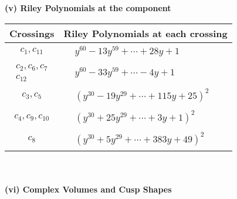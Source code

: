 \documentclass[1p]{elsarticle_modified}
\theoremstyle{definition}
\begin{document}
\newpage\renewcommand{\arraystretch}{1}
\flushleft \textbf{(v) Riley Polynomials at the component}\newline \\
\begin{tabular}{m{50pt}|m{274pt}}
Crossings & \hspace{64pt}Riley Polynomials at each crossing \\
\hline $$\begin{aligned}c_{1},c_{11}\end{aligned}$$&$\begin{aligned}
&y^{60}-13 y^{59}+\cdots+28 y+1
\end{aligned}$\\
\hline $$\begin{aligned}c_{2},c_{6},c_{7}\\c_{12}\end{aligned}$$&$\begin{aligned}
&y^{60}-33 y^{59}+\cdots-4 y+1
\end{aligned}$\\
\hline $$\begin{aligned}c_{3},c_{5}\end{aligned}$$&$\begin{aligned}
&(y^{30}-19 y^{29}+\cdots+115 y+25)^{2}
\end{aligned}$\\
\hline $$\begin{aligned}c_{4},c_{9},c_{10}\end{aligned}$$&$\begin{aligned}
&(y^{30}+25 y^{29}+\cdots+3 y+1)^{2}
\end{aligned}$\\
\hline $$\begin{aligned}c_{8}\end{aligned}$$&$\begin{aligned}
&(y^{30}+5 y^{29}+\cdots+383 y+49)^{2}
\end{aligned}$\\
\hline
\end{tabular}\\~\\
\newpage\flushleft \textbf{(vi) Complex Volumes and Cusp Shapes}
\end{document}
